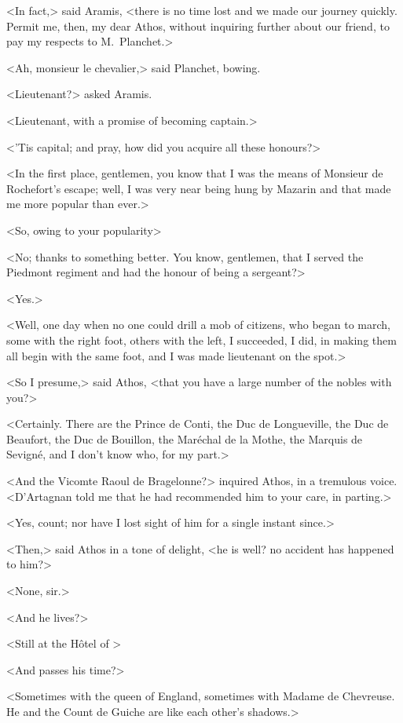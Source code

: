 <In fact,> said Aramis, <there is no time lost and we made our journey quickly. Permit me, then, my dear Athos, without inquiring further about our friend, to pay my respects to M.~Planchet.>

<Ah, monsieur le chevalier,> said Planchet, bowing.

<Lieutenant?> asked Aramis.

<Lieutenant, with a promise of becoming captain.>

<'Tis capital; and pray, how did you acquire all these honours?>

<In the first place, gentlemen, you know that I was the means of Monsieur de Rochefort's escape; well, I was very near being hung by Mazarin and that made me more popular than ever.>

<So, owing to your popularity\longdash>

<No; thanks to something better. You know, gentlemen, that I served the Piedmont regiment and had the honour of being a sergeant?>

<Yes.>

<Well, one day when no one could drill a mob of citizens, who began to march, some with the right foot, others with the left, I succeeded, I did, in making them all begin with the same foot, and I was made lieutenant on the spot.>

<So I presume,> said Athos, <that you have a large number of the nobles with you?>

<Certainly. There are the Prince de Conti, the Duc de Longueville, the Duc de Beaufort, the Duc de Bouillon, the Maréchal de la Mothe, the Marquis de Sevigné, and I don't know who, for my part.>

<And the Vicomte Raoul de Bragelonne?> inquired Athos, in a tremulous voice. <D'Artagnan told me that he had recommended him to your care, in parting.>

<Yes, count; nor have I lost sight of him for a single instant since.>

<Then,> said Athos in a tone of delight, <he is well? no accident has happened to him?>

<None, sir.>

<And he lives?>

<Still at the Hôtel of >

<And passes his time?>

<Sometimes with the queen of England, sometimes with Madame de Chevreuse. He and the Count de Guiche are like each other's shadows.>

